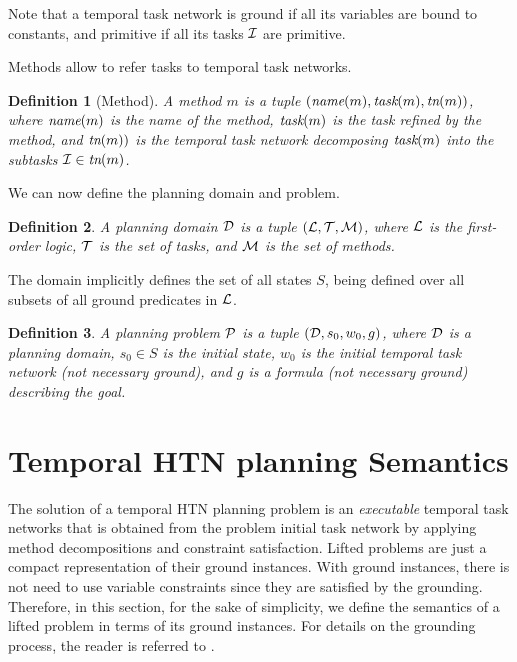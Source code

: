 \documentclass[letterpaper]{article} %
\newtheorem{definition}{Definition}
\newcommand{\name}{\text{\it name}}
\newcommand{\task}{\text{\it task}}
\newcommand{\tn}{\text{\it tn}}
\begin{document}
Note that a temporal task network is ground if all its variables are bound to constants, and primitive if all its tasks ${\cal{I}}$ are primitive. 

Methods allow to refer tasks to temporal task networks. 
\begin{definition}[Method]
A {\em method} $m$ is a tuple $(\name(m), \task(m), \tn(m))$, where $\name(m)$ is the name of the method, $\task(m)$ is the task refined by the method, and $\tn(m))$ is the temporal task network decomposing $\task(m)$ into the subtasks ${\cal{I}} \in \tn(m)$.
\end{definition}
 We can now define the planning domain and problem.
\begin{definition}
 A {\em planning domain} $\cal{D}$ is a tuple $({\cal{L}}, {\cal{T}}, {\cal{M}})$, where $\cal{L}$ is the first-order logic, $\cal{T}$ is the set of tasks, and $\cal{M}$ is the set of methods. %
 \end{definition}
 
 The domain implicitly defines the set of all states $S$, being defined over all subsets of all ground predicates in $\cal{L}$.
 
 \begin{definition}
 A {\em planning problem} $\cal{P}$ is a tuple $({\cal{D}}, {s_0}, w_0, g)$, where $\cal{D}$ is a planning domain, $s_0 \in S$ is the initial state, $w_0$ is the initial temporal task network (not necessary ground), and $g$ is a formula (not necessary ground) describing the goal. 
 \end{definition}
 
 \section{Temporal HTN planning Semantics}
 \label{THTN}
 
 The solution of a temporal HTN planning problem is an {\it executable} temporal task networks that is obtained from the problem initial task network by applying method decompositions and constraint satisfaction. Lifted problems are just a compact representation of their ground instances. With ground instances, there is not need to use variable constraints since they are satisfied by the grounding. Therefore, in this section, for the sake of simplicity, we define the semantics of a lifted problem in terms of its ground instances. For details on the grounding process, the reader is referred to \cite{behnke20,ramoul17}.
 
\end{document}
